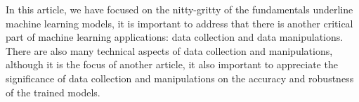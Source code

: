 In this article, we have focused on the nitty-gritty of the fundamentals underline machine learning models, it is important to address that there is another critical part of machine learning applications: data collection and data manipulations. There are also many technical aspects of data collection and manipulations, although it is the focus of another article, it also important to appreciate the significance of data collection and manipulations on the accuracy and robustness of the trained models. 